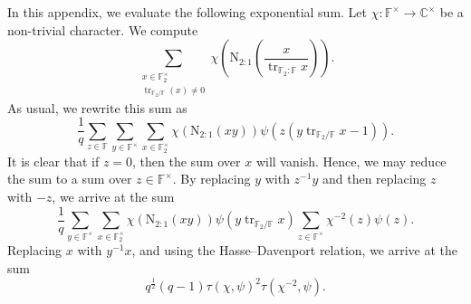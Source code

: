 \documentclass[12pt, reqno]{amsart}
\theoremstyle{definition}
\theoremstyle{definition}
\theoremstyle{definition}
\newcommand{\cComplex}{\mathbb{C}}
\newcommand{\multiplicativegroup}[1]{#1^{\times}}
\newcommand{\fieldCharacter}{\psi}
\newcommand{\trace}{\operatorname{tr}}
\newcommand{\FieldNorm}[2]{\mathrm{N}_{#1:#2}}
\newcommand{\finiteField}{\mathbb{F}}
\newcommand{\finiteFieldExtension}[1]{\finiteField_{#1}}
\begin{document}
In this appendix, we evaluate the following exponential sum. Let $\chi \colon \multiplicativegroup{\finiteField} \to \multiplicativegroup{\cComplex}$ be a non-trivial character. We compute $$\sum_{\substack{x \in \multiplicativegroup{\finiteFieldExtension{2}}\\
	\trace_{\finiteFieldExtension{2} \slash \finiteField}\left(x\right) \ne 0}} \chi\left(\FieldNorm{2}{1}\left(\frac{x}{\trace_{\finiteFieldExtension{2} \colon \finiteField} x}\right) \right).$$
As usual, we rewrite this sum as
$$\frac{1}{q} \sum_{z \in \finiteField} \sum_{y \in \multiplicativegroup{\finiteField}} \sum_{x \in \multiplicativegroup{\finiteFieldExtension{2}}} \chi\left(\FieldNorm{2}{1}\left(xy\right)\right) \fieldCharacter\left(z\left(y \trace_{\finiteFieldExtension{2} \slash \finiteField} x - 1\right)\right).$$
It is clear that if $z = 0$, then the sum over $x$ will vanish. Hence, we may reduce the sum to a sum over $z \in \multiplicativegroup{\finiteField}$. By replacing $y$ with $z^{-1} y$ and then replacing $z$ with $-z$, we arrive at the sum
$$\frac{1}{q} \sum_{y \in \multiplicativegroup{\finiteField}} \sum_{x \in \multiplicativegroup{\finiteFieldExtension{2}}} \chi\left(\FieldNorm{2}{1}\left(xy\right)\right) \fieldCharacter\left(y \trace_{\finiteFieldExtension{2} \slash \finiteField} x\right) \sum_{z \in \multiplicativegroup{\finiteField}} \chi^{-2}\left(z\right)\fieldCharacter\left(z\right).$$
Replacing $x$ with $y^{-1}x$, and using the Hasse--Davenport relation, we arrive at the sum
$$q^{\frac{1}{2}} \left(q-1\right) \tau\left(\chi, \fieldCharacter\right)^2 \tau\left(\chi^{-2}, \fieldCharacter\right).$$


\end{document}
